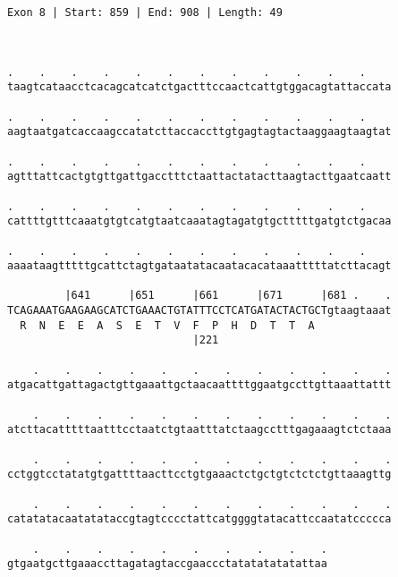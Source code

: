 \documentclass{article}
\begin{document}
\begin{Verbatim}
Exon 8 | Start: 859 | End: 908 | Length: 49



.    .    .    .    .    .    .    .    .    .    .    .    
taagtcataacctcacagcatcatctgactttccaactcattgtggacagtattaccata
                                                            
.    .    .    .    .    .    .    .    .    .    .    .    
aagtaatgatcaccaagccatatcttaccaccttgtgagtagtactaaggaagtaagtat
                                                            
.    .    .    .    .    .    .    .    .    .    .    .    
agtttattcactgtgttgattgacctttctaattactatacttaagtacttgaatcaatt
                                                            
.    .    .    .    .    .    .    .    .    .    .    .    
cattttgtttcaaatgtgtcatgtaatcaaatagtagatgtgctttttgatgtctgacaa
                                                            
.    .    .    .    .    .    .    .    .    .    .    .    
aaaataagtttttgcattctagtgataatatacaatacacataaatttttatcttacagt
                                                            
         |641      |651      |661      |671      |681 .    .
TCAGAAATGAAGAAGCATCTGAAACTGTATTTCCTCATGATACTACTGCTgtaagtaaat
  R  N  E  E  A  S  E  T  V  F  P  H  D  T  T  A            
                             |221                           
  
    .    .    .    .    .    .    .    .    .    .    .    .
atgacattgattagactgttgaaattgctaacaattttggaatgccttgttaaattattt
                                                            
    .    .    .    .    .    .    .    .    .    .    .    .
atcttacatttttaatttcctaatctgtaatttatctaagcctttgagaaagtctctaaa
                                                            
    .    .    .    .    .    .    .    .    .    .    .    .
cctggtcctatatgtgattttaacttcctgtgaaactctgctgtctctctgttaaagttg
                                                            
    .    .    .    .    .    .    .    .    .    .    .    .
catatatacaatatataccgtagtcccctattcatggggtatacattccaatatccccca
                                                            
    .    .    .    .    .    .    .    .    .    .
gtgaatgcttgaaaccttagatagtaccgaaccctatatatatatattaa
                                                  

\end{Verbatim}
\end{document}
